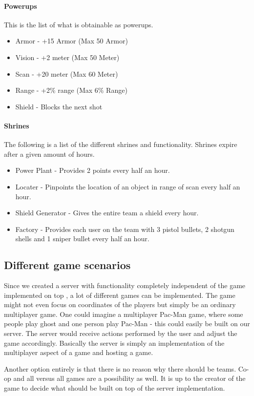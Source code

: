 \paragraph{Powerups}
This is the list of what is obtainable as powerups.
\begin{itemize}
\item Armor - +15 Armor (Max 50 Armor)
\item Vision - +2 meter (Max 50 Meter)
\item Scan - +20 meter (Max 60 Meter)
\item Range - +2\% range (Max 6\% Range)
\item Shield - Blocks the next shot
\end{itemize}

\paragraph{Shrines}
The following is a list of the different shrines and functionality. Shrines expire after a given amount of hours.
\begin{itemize}
\item Power Plant - Provides 2 points every half an hour.
\item Locater - Pinpoints the location of an object in range of scan every half an hour.
\item Shield Generator - Gives the entire team a shield every hour.
\item Factory - Provides each user on the team with 3 pistol bullets, 2 shotgun shells and 1 sniper bullet every half an hour.
\end{itemize}

\subsection{Different game scenarios}\label{subsec:game-scenarios}
Since we created a server with functionality completely independent of the game implemented on top , a lot of different games can be implemented. The game might not even focus on coordinates of the players but simply be an ordinary multiplayer game. One could imagine a multiplayer Pac-Man game, where some people play ghost and one person play Pac-Man - this could easily be built on our server. The server would receive actions performed by the user and adjust the game accordingly.
Basically the server is simply an implementation of the multiplayer aspect of a game and hosting a game.

Another option entirely is that there is no reason why there should be teams. Co-op and all versus all games are a possibility as well. It is up to the creator of the game to decide what should be built on top of the server implementation.


